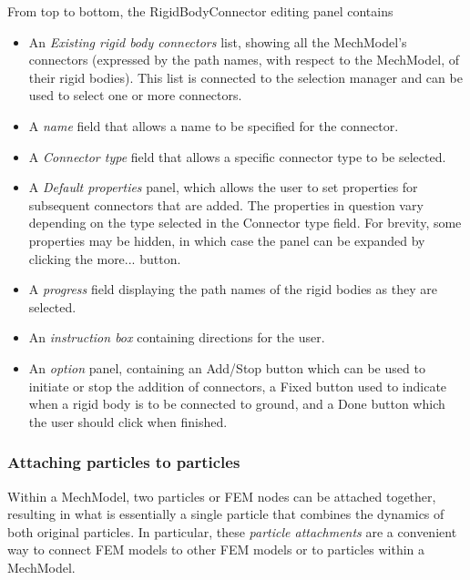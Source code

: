 \documentclass{article}
\begin{document}
From top to bottom, the RigidBodyConnector editing panel contains

\begin{itemize}

\item An {\it Existing rigid body connectors} list, showing all the MechModel's
connectors (expressed by the path names, with respect to the MechModel,
of their rigid bodies). This list is connected to the selection manager and
can be used to select one or more connectors.

\item A {\it name} field that allows a name to be specified for the connector.

\item A {\it Connector type} field that allows a specific connector
type to be selected.

\item A {\it Default properties} panel, which allows the user to set
properties for subsequent connectors that are added. The properties in
question vary depending on the type selected in the {\sf Connector type}
field. For brevity, some properties may be hidden, in which case the
panel can be expanded by clicking the {\sf more...} button.

\item A {\it progress} field displaying the path names of the rigid bodies
as they are selected.

\item An {\it instruction box} containing directions for the user.

\item An {\it option} panel, containing an {\sf Add/Stop} button which can be used
to initiate or stop the addition of connectors, a {\sf Fixed} button used
to indicate when a rigid body is to be connected to ground, and a
{\sf Done} button which the user should click when finished.

\end{itemize}

\subsubsection{Attaching particles to particles}
\label{particleParticleAttachmentSec}

Within a MechModel, two particles or FEM nodes can be attached
together, resulting in what is essentially a single particle that
combines the dynamics of both original particles. In particular, these
{\it particle attachments} are a convenient way to connect FEM models to
other FEM models or to particles within a MechModel.
\end{document}
